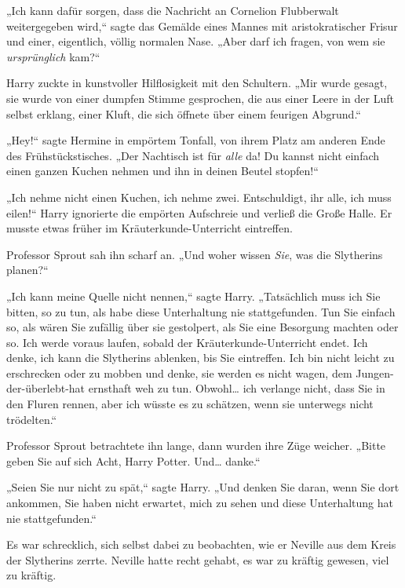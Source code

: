 {\later

„Ich kann dafür sorgen, dass die Nachricht an Cornelion Flubberwalt weitergegeben wird,“ sagte das Gemälde eines Mannes mit aristokratischer Frisur und einer, eigentlich, völlig normalen Nase. „Aber darf ich fragen, von wem sie \emph{ursprünglich} kam?“

Harry zuckte in kunstvoller Hilflosigkeit mit den Schultern. „Mir wurde gesagt, sie wurde von einer dumpfen Stimme gesprochen, die aus einer Leere in der Luft selbst erklang, einer Kluft, die sich öffnete über einem feurigen Abgrund.“

\later

„Hey!“ sagte Hermine in empörtem Tonfall, von ihrem Platz am anderen Ende des Frühstückstisches. „Der Nachtisch ist für \emph{alle} da! Du kannst nicht einfach einen ganzen Kuchen nehmen und ihn in deinen Beutel stopfen!“

„Ich nehme nicht einen Kuchen, ich nehme zwei. Entschuldigt, ihr alle, ich muss eilen!“ Harry ignorierte die empörten Aufschreie und verließ die Große Halle. Er musste etwas früher im Kräuterkunde-Unterricht eintreffen.

\later

Professor Sprout sah ihn scharf an. „Und woher wissen \emph{Sie}, was die Slytherins planen?“

„Ich kann meine Quelle nicht nennen,“ sagte Harry. „Tatsächlich muss ich Sie bitten, so zu tun, als habe diese Unterhaltung nie stattgefunden. Tun Sie einfach so, als wären Sie zufällig über sie gestolpert, als Sie eine Besorgung machten oder so. Ich werde voraus laufen, sobald der Kräuterkunde-Unterricht endet. Ich denke, ich kann die Slytherins ablenken, bis Sie eintreffen. Ich bin nicht leicht zu erschrecken oder zu mobben und denke, sie werden es nicht wagen, dem Jungen-der-überlebt-hat ernsthaft weh zu tun. Obwohl… ich verlange nicht, dass Sie in den Fluren rennen, aber ich wüsste es zu schätzen, wenn sie unterwegs nicht trödelten.“

Professor Sprout betrachtete ihn lange, dann wurden ihre Züge weicher. „Bitte geben Sie auf sich Acht, Harry Potter. Und… danke.“

„Seien Sie nur nicht zu spät,“ sagte Harry. „Und denken Sie daran, wenn Sie dort ankommen, Sie haben nicht erwartet, mich zu sehen und diese Unterhaltung hat nie stattgefunden.“

\later

Es war schrecklich, sich selbst dabei zu beobachten, wie er Neville aus dem Kreis der Slytherins zerrte. Neville hatte recht gehabt, es war zu kräftig gewesen, viel zu kräftig.

}

